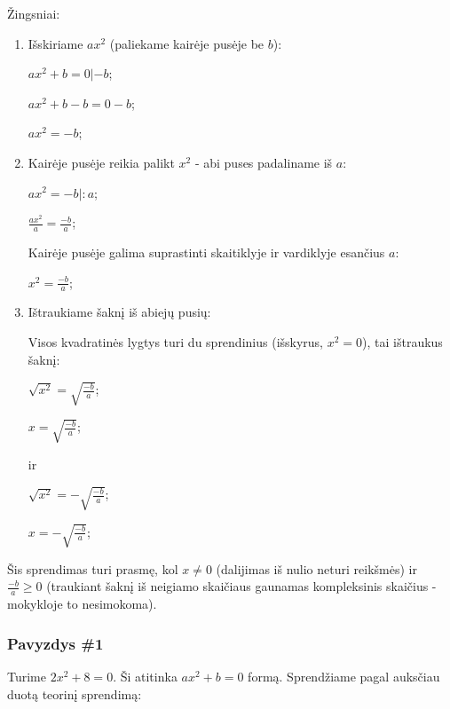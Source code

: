 \documentclass[a4paper]{article}
\begin{document}
Žingsniai:
\begin{enumerate}

      \item  Išskiriame $ ax^{2} $ (paliekame kairėje pusėje be $ b $):

            $ ax^{2}+b=0 | -b $;

            $ ax^{2}+b-b=0-b $;

            $ ax^{2}=-b $;

      \item Kairėje pusėje reikia palikt $ x^2 $ - abi puses padaliname iš $ a
            $:

            $ ax^{2}=-b |:a $;

            $ \frac{ax^{2}}{a}=\frac{-b}{a}$;

            Kairėje pusėje galima suprastinti skaitiklyje ir vardiklyje
            esančius
            $ a $:

            $ x^{2}=\frac{-b}{a}$;

      \item Ištraukiame šaknį iš abiejų pusių:

            Visos kvadratinės lygtys turi du sprendinius (išskyrus, $ x^2=0 $),
            tai ištraukus šaknį:

            $ \sqrt{x^{2}}=\sqrt{\frac{-b}{a}}$;

            $ x=\sqrt{\frac{-b}{a}}$;

            ir

            $ \sqrt{x^{2}}=-\sqrt{\frac{-b}{a}}$;

            $ x=-\sqrt{\frac{-b}{a}}$;

\end{enumerate}

Šis sprendimas turi prasmę, kol $ x \neq 0 $ (dalijimas iš nulio neturi
reikšmės) ir $ \frac{-b}{a} \ge 0 $ (traukiant šaknį iš neigiamo skaičiaus
gaunamas kompleksinis skaičius - mokykloje to nesimokoma).

\subsubsection{Pavyzdys \#1}

Turime $ 2x^{2}+8=0 $. Ši atitinka $ ax^{2}+b=0 $ formą. Sprendžiame pagal
auksčiau duotą teorinį sprendimą:
\end{document}
